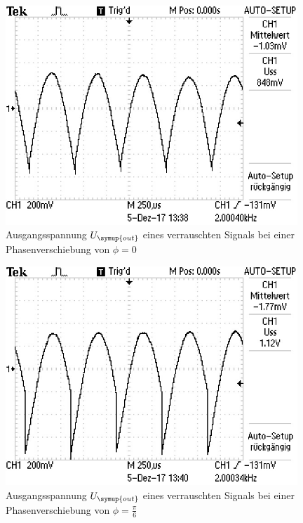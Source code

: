 \begin{figure}
  \centering
  \includegraphics[width=11cm]{data/rauschen_0.jpg}
  \caption{Ausgangsspannung $U_{\symup{out}}$ eines verrauschten Signals bei einer Phasenverschiebung
  von $\phi=0$}
  \label{fig:rauschen_0}
\end{figure}

\begin{figure}
  \centering
  \includegraphics[width=11cm]{data/rauschen_30.jpg}
  \caption{Ausgangsspannung $U_{\symup{out}}$ eines verrauschten Signals bei einer Phasenverschiebung
  von $\phi=\frac{\pi}{6}$}
  \label{fig:rauschen_30}
\end{figure}

